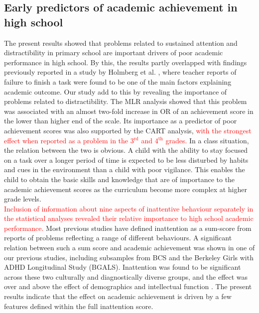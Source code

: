 \documentclass[10pt,letterpaper]{article}
\begin{document}
{{\subsection*{Early predictors of academic achievement in high school}
The present results showed that problems related to sustained attention and distractibility in primary school are important drivers of poor academic performance in high school. By this, the results partly overlapped with findings previously reported in a study by Holmberg et al. \cite{Holmberg2014}, where  teacher reports of failure to finish a task were found to be one of the main factors explaining academic outcome. 
Our study add to this by revealing the importance of problems related to distractibility. The MLR analysis showed that this problem was associated with an almost two-fold increase in OR of an achievement score in the lower than higher end of the scale. Its importance as a predictor of poor achievement scores was also supported by the CART analysis, \textcolor{red}{with the strongest effect when reported as a problem in the  3$^{\text{rd}}$ and 4$^{\text{th}}$ grades.}  In a class situation, the relation between the two is obvious. A child with the ability to stay focused on a task over a longer period of time is expected to be less disturbed by habits and cues in the environment than a child with poor vigilance.  This enables the child to obtain the basic skills and knowledge that are of importance to the academic achievement scores as the curriculum become more complex at higher grade levels. \\

\textcolor{red}{Inclusion of information about nine aspects of inattentive behaviour separately in the statistical analyses revealed their relative importance to high school academic performance.} Most previous studies have defined inattention as a sum-score from reports of problems reflecting a range of different behaviours. A significant relation between such a sum score and academic achievement was shown in one of our previous studies, including subsamples from BCS and the Berkeley Girls with ADHD Longitudinal Study (BGALS). Inattention was found to be significant across these two culturally and diagnostically diverse groups, and the effect was over and above the effect of demographics and intellectual function \cite{Lundervold2017}. The present results indicate that the effect on academic achievement is driven by a few features defined within the full inattention score.  \\

}}
\end{document}
